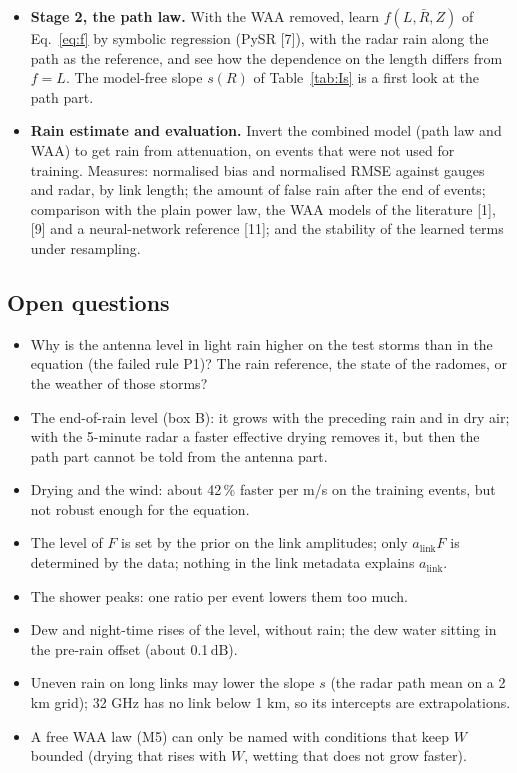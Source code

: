 \documentclass[11pt,a4paper]{article}
\newcommand{\Rbar}{\bar{R}}
\newcommand{\dB}{\,\mathrm{dB}}
\begin{document}
\begin{itemize}
\item \textbf{Stage 2, the path law.} With the WAA removed, learn $f(L,\Rbar,Z)$ of Eq.~\eqref{eq:f} by symbolic
regression (PySR [7]), with the radar rain along the path as the reference, and see how the dependence on the length
differs from $f = L$. The model-free slope $s(R)$ of Table~\ref{tab:Is} is a first look at the path part.
\item \textbf{Rain estimate and evaluation.} Invert the combined model (path law and WAA) to get rain from
attenuation, on events that were not used for training. Measures: normalised bias and normalised RMSE against gauges
and radar, by link length; the amount of false rain after the end of events; comparison with the plain power law, the
WAA models of the literature [1], [9] and a neural-network reference [11]; and the stability of the learned terms
under resampling.
\end{itemize}

\subsection{Open questions}

\begin{itemize}
\item Why is the antenna level in light rain higher on the test storms than in the equation (the failed rule P1)? The rain
reference, the state of the radomes, or the weather of those storms?
\item The end-of-rain level (box B): it grows with the preceding rain and in dry air; with the 5-minute radar a faster
effective drying removes it, but then the path part cannot be told from the antenna part.
\item Drying and the wind: about 42\,\% faster per m/s on the training events, but not robust enough for the equation.
\item The level of $F$ is set by the prior on the link amplitudes; only $a_{\mathrm{link}}F$ is determined by the
data; nothing in the link metadata explains $a_{\mathrm{link}}$.
\item The shower peaks: one ratio per event lowers them too much.
\item Dew and night-time rises of the level, without rain; the dew water sitting in the pre-rain offset (about 0.1$\dB$).
\item Uneven rain on long links may lower the slope $s$ (the radar path mean on a 2 km grid); 32 GHz has no link
below 1 km, so its intercepts are extrapolations.
\item A free WAA law (M5) can only be named with conditions that keep $W$ bounded (drying that rises with $W$,
wetting that does not grow faster).
\end{itemize}
\end{document}
